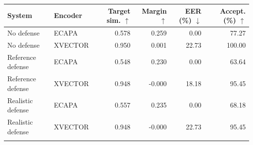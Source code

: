 \begin{tabular}{llrrrr}
\toprule
System & Encoder & Target sim. $\uparrow$ & Margin $\uparrow$ & EER (\%) $\downarrow$ & Accept. (\%) $\uparrow$ \\
\midrule
No defense & ECAPA & 0.578 & 0.259 & 0.00 & 77.27 \\
No defense & XVECTOR & 0.950 & 0.001 & 22.73 & 100.00 \\
\addlinespace
Reference defense & ECAPA & 0.548 & 0.230 & 0.00 & 63.64 \\
Reference defense & XVECTOR & 0.948 & -0.000 & 18.18 & 95.45 \\
\addlinespace
Realistic defense & ECAPA & 0.557 & 0.235 & 0.00 & 68.18 \\
Realistic defense & XVECTOR & 0.948 & -0.000 & 22.73 & 95.45 \\
\addlinespace
\bottomrule
\end{tabular}
